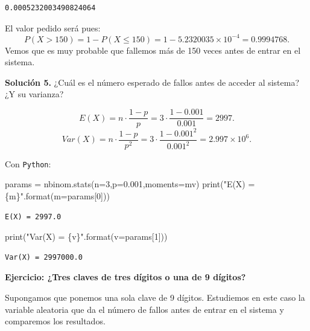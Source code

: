 \documentclass[
  letterpaper,
  DIV=11,
  numbers=noendperiod]{scrreprt}
\newenvironment{Shaded}{\begin{snugshade}}{\end{snugshade}}
\newcommand{\BuiltInTok}[1]{\textcolor[rgb]{0.00,0.23,0.31}{#1}}
\newcommand{\DecValTok}[1]{\textcolor[rgb]{0.68,0.00,0.00}{#1}}
\newcommand{\FloatTok}[1]{\textcolor[rgb]{0.68,0.00,0.00}{#1}}
\newcommand{\NormalTok}[1]{\textcolor[rgb]{0.00,0.23,0.31}{#1}}
\newcommand{\OperatorTok}[1]{\textcolor[rgb]{0.37,0.37,0.37}{#1}}
\newcommand{\SpecialCharTok}[1]{\textcolor[rgb]{0.37,0.37,0.37}{#1}}
\newcommand{\StringTok}[1]{\textcolor[rgb]{0.13,0.47,0.30}{#1}}
\begin{document}
\begin{verbatim}
0.0005232003490824064
\end{verbatim}

El valor pedido será pues: \[
P(X>150)=1-P(X\leq 150)=1-\ensuremath{5.2320035\times 10^{-4}}=0.9994768.
\] Vemos que es muy probable que fallemos más de 150 veces antes de
entrar en el sistema.

\textbf{Solución 5.} ¿Cuál es el número esperado de fallos antes de
acceder al sistema? ¿Y su varianza?

\[E(X)=n\cdot \frac{1-p}{p}=3\cdot \frac{1- 0.001}{0.001}=2997.\]
\[Var(X)=n\cdot \frac{1-p}{p^2}=3\cdot \frac{1- 0.001^2}{0.001^2}=\ensuremath{2.997\times 10^{6}}.\]

Con \texttt{Python}:

\begin{Shaded}
\begin{Highlighting}[]
\NormalTok{params }\OperatorTok{=}\NormalTok{ nbinom.stats(n}\OperatorTok{=}\DecValTok{3}\NormalTok{,p}\OperatorTok{=}\FloatTok{0.001}\NormalTok{,moments}\OperatorTok{=}\StringTok{\textquotesingle{}mv\textquotesingle{}}\NormalTok{)}
\BuiltInTok{print}\NormalTok{(}\StringTok{"E(X) = }\SpecialCharTok{\{m\}}\StringTok{"}\NormalTok{.}\BuiltInTok{format}\NormalTok{(m}\OperatorTok{=}\NormalTok{params[}\DecValTok{0}\NormalTok{]))}
\end{Highlighting}
\end{Shaded}

\begin{verbatim}
E(X) = 2997.0
\end{verbatim}

\begin{Shaded}
\begin{Highlighting}[]
\BuiltInTok{print}\NormalTok{(}\StringTok{"Var(X) = }\SpecialCharTok{\{v\}}\StringTok{"}\NormalTok{.}\BuiltInTok{format}\NormalTok{(v}\OperatorTok{=}\NormalTok{params[}\DecValTok{1}\NormalTok{]))}
\end{Highlighting}
\end{Shaded}

\begin{verbatim}
Var(X) = 2997000.0
\end{verbatim}

\textbf{Ejercicio: ¿Tres claves de tres dígitos o una de 9 dígitos?}

Supongamos que ponemos una sola clave de 9 dígitos. Estudiemos en este
caso la variable aleatoria que da el número de fallos antes de entrar en
el sistema y comparemos los resultados.
\end{document}
